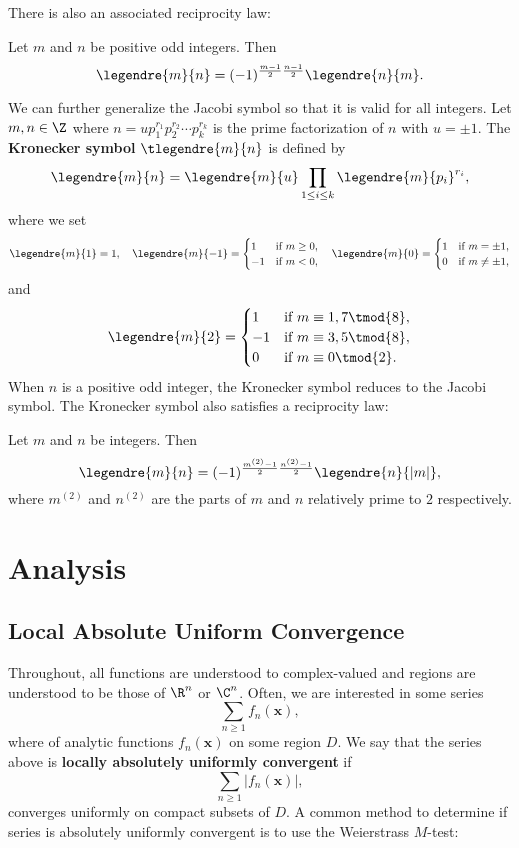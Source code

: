     There is also an associated reciprocity law:
    \begin{proposition}
      Let $m$ and $n$ be positive odd integers. Then
      \[
        \legendre{m}{n} = (-1)^{\frac{m-1}{2}\frac{n-1}{2}}\legendre{n}{m}.
      \]
    \end{proposition}
    We can further generalize the Jacobi symbol so that it is valid for all integers. Let $m,n \in \Z$ where $n = up_{1}^{r_{1}}p_{2}^{r_{2}} \cdots p_{k}^{r_{k}}$ is the prime factorization of $n$ with $u = \pm1$. The \textbf{Kronecker symbol} $\tlegendre{m}{n}$ is defined by
    \[
      \legendre{m}{n} = \legendre{m}{u}\prod_{1 \le i \le k}\legendre{m}{p_{i}}^{r_{i}},
    \]
    where we set
    \[
      \legendre{m}{1} = 1, \quad \legendre{m}{-1} = \begin{cases} 1 & \text{if $m \ge 0$}, \\ -1 & \text{if $m < 0$}, \end{cases} \quad \legendre{m}{0} = \begin{cases} 1 & \text{if $m = \pm 1$}, \\ 0 & \text{if $m \neq \pm 1$}, \end{cases}
    \]
    and
    \[
      \legendre{m}{2} = \begin{cases} 1 & \text{if $m \equiv 1,7 \tmod{8}$}, \\ -1 & \text{if $m \equiv 3,5 \tmod{8}$}, \\ 0 & \text{if $m \equiv 0 \tmod{2}$}. \end{cases}
    \]
    When $n$ is a positive odd integer, the Kronecker symbol reduces to the Jacobi symbol. The Kronecker symbol also satisfies a reciprocity law:
    \begin{proposition}
      Let $m$ and $n$ be integers. Then
      \[
        \legendre{m}{n} = (-1)^{\frac{m^{(2)}-1}{2}\frac{n^{(2)}-1}{2}}\legendre{n}{|m|},
      \]
      where $m^{(2)}$ and $n^{(2)}$ are the parts of $m$ and $n$ relatively prime to $2$ respectively.
    \end{proposition}
\chapter{Analysis}
  \section{Local Absolute Uniform Convergence}
    Throughout, all functions are understood to complex-valued and regions are understood to be those of $\R^{n}$ or $\C^{n}$. Often, we are interested in some series
    \[
      \sum_{n \ge 1}f_{n}(\mathbf{x}),
    \]
    where of analytic functions $f_{n}(\mathbf{x})$ on some region $D$. We say that the series above is \textbf{locally absolutely uniformly convergent} if
    \[
      \sum_{n \ge 1}|f_{n}(\mathbf{x})|,
    \]
    converges uniformly on compact subsets of $D$. A common method to determine if series is absolutely uniformly convergent is to use the Weierstrass $M$-test:

